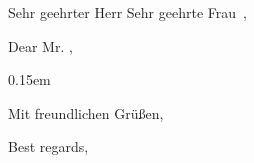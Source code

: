 \documentclass[de]{RFFE_LETTER}
\newcommand{\VAR}[1]{}
\newcommand{\kdFaN}{\VAR{kd.FaN}} %
\newcommand{\kdFaNErg}{\VAR{kd.FaNErg}} %
\newcommand{\kdVN}{\VAR{kd.VN}} %
\newcommand{\kdNN}{\VAR{kd.NN}} %
\newcommand{\kdPLZ}{\VAR{kd.PLZ}} %
\newcommand{\kdAnschr}{\VAR{kd.Anschr}} %
\newcommand{\kdSt}{\VAR{kd.St}} %
\newcommand{\kdGeschl}{\VAR{kd.Geschl}}
\newcommand{\Anrede}{%
	\ifthenelse{\equal{\kdGeschl}{M}}
	{Sehr geehrter Herr \VAR{kd.Titel}}
	{Sehr geehrte Frau \VAR{kd.Titel}}%
}
\begin{document}
	\begin{letter}
	{
		\kdFaN\newline
		\kdFaNErg\newline
		\kdVN\:\kdNN\newline
		\kdAnschr\newline
		\kdPLZ\:\kdSt
	}

	
	{
		\opening{\Anrede\,\kdNN,}
		
	}
	{
		\opening{Dear Mr. \kdNN,}
	}
		\openup 0.15em
	{}
	
	{
		\closing{Mit freundlichen Grüßen,}
	}
	{
		\closing{Best regards,}
	}
		
	\end{letter}

\newpage

\end{document}
